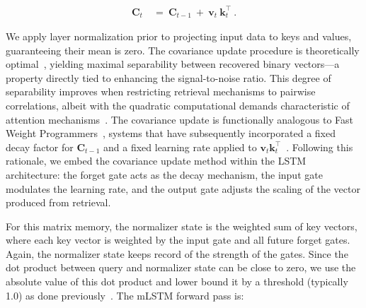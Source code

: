 \begin{align}
\mathbf{C}_t \ &= \ \mathbf{C}_{t-1} \ + \ \mathbf{v}_{t} \ \mathbf{k}_t^\top \ .
\end{align}

We apply layer normalization prior to projecting input data to keys and values, guaranteeing their mean is zero. The covariance update procedure is theoretically optimal~\citep{Dayan:91}, yielding maximal separability between recovered binary vectors—a property directly tied to enhancing the signal-to-noise ratio. This degree of separability improves when restricting retrieval mechanisms to pairwise correlations, albeit with the quadratic computational demands characteristic of attention mechanisms~\citep{Krotov:16,Krotov:17,Ramsauer:21}. The covariance update is functionally analogous to Fast Weight Programmers~\citep{Schmidhuber:92ncfastweights,Schlag:21}, systems that have subsequently incorporated a fixed decay factor for $\mathbf{C}_{t-1}$ and a fixed learning rate applied to 
$\mathbf{v}_{t} \mathbf{k}_t ^\top$~\citep{Ba:16}.
Following this rationale, we embed the covariance update method within the LSTM architecture: the forget gate acts as the decay mechanism, the input gate modulates the learning rate, and the output gate adjusts the scaling of the vector produced from retrieval.

For this matrix memory, the normalizer state is the weighted sum of key vectors, where each key vector is weighted by the input gate and all future forget gates. Again, the normalizer state keeps record of the strength of the gates. Since the dot product between query and normalizer state can be close to zero, we use the absolute value of this dot product and lower bound it by a threshold (typically 1.0) as done previously~\citep{Sun:23arxiv}. The mLSTM forward pass is:


